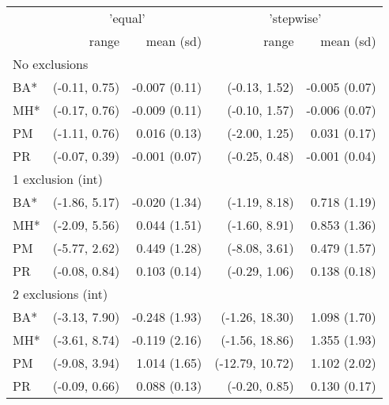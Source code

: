 \begin{table}[t]
\centering\small
\begin{tabular}{lrrrr}
\toprule
 & \multicolumn{2}{c}{'equal'} & \multicolumn{2}{c}{'stepwise'} \\ 
\cmidrule(lr){2-3} \cmidrule(lr){4-5}
 & range & mean (sd) & range & mean (sd) \\ 
\midrule
\multicolumn{5}{l}{No exclusions} \\ 
\midrule
\hspace{11.25pt} BA* & (-0.11, 0.75) & -0.007 (0.11) & (-0.13, 1.52) & -0.005 (0.07) \\ 
\hspace{11.25pt} MH* & (-0.17, 0.76) & -0.009 (0.11) & (-0.10, 1.57) & -0.006 (0.07) \\ 
\hspace{11.25pt} PM & (-1.11, 0.76) & 0.016 (0.13) & (-2.00, 1.25) & 0.031 (0.17) \\ 
\hspace{11.25pt} PR & (-0.07, 0.39) & -0.001 (0.07) & (-0.25, 0.48) & -0.001 (0.04) \\ 
\midrule
\multicolumn{5}{l}{1 exclusion (int)} \\ 
\midrule
\hspace{11.25pt} BA* & (-1.86, 5.17) & -0.020 (1.34) & (-1.19, 8.18) & 0.718 (1.19) \\ 
\hspace{11.25pt} MH* & (-2.09, 5.56) & 0.044 (1.51) & (-1.60, 8.91) & 0.853 (1.36) \\ 
\hspace{11.25pt} PM & (-5.77, 2.62) & 0.449 (1.28) & (-8.08, 3.61) & 0.479 (1.57) \\ 
\hspace{11.25pt} PR & (-0.08, 0.84) & 0.103 (0.14) & (-0.29, 1.06) & 0.138 (0.18) \\ 
\midrule
\multicolumn{5}{l}{2 exclusions (int)} \\ 
\midrule
\hspace{11.25pt} BA* & (-3.13, 7.90) & -0.248 (1.93) & (-1.26, 18.30) & 1.098 (1.70) \\ 
\hspace{11.25pt} MH* & (-3.61, 8.74) & -0.119 (2.16) & (-1.56, 18.86) & 1.355 (1.93) \\ 
\hspace{11.25pt} PM & (-9.08, 3.94) & 1.014 (1.65) & (-12.79, 10.72) & 1.102 (2.02) \\ 
\hspace{11.25pt} PR & (-0.09, 0.66) & 0.088 (0.13) & (-0.20, 0.85) & 0.130 (0.17) \\ 

\end{tabular}
\end{table}

